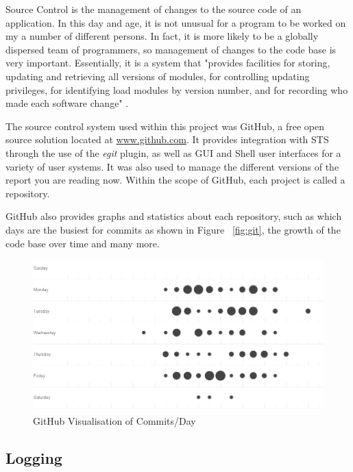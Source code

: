 Source Control is the management of changes to the source code of an application. In this day and age, it is not unusual for a program to be worked on my a number of different persons. In fact, it is more likely to be a globally dispersed team of programmers, so management of changes to the code base is very important. Essentially, it is a system that "provides facilities for storing, updating and retrieving all versions of modules, for controlling updating privileges, for identifying load modules by version number, and for recording who made each software change" \parencite{rochkind1975source}.

The source control system used within this project was GitHub, a free open source solution located at \href{http://www.github.com}{www.github.com}. It provides integration with STS through the use of the \textit{egit} plugin, as well as GUI and Shell user interfaces for a variety of user systems. It was also used to manage the different versions of the report you are reading now. Within the scope of GitHub, each project is called a repository.

GitHub also provides graphs and statistics about each repository, such as which days are the busiest for commits as shown in Figure ~\ref{fig:git}, the growth of the code base over time and many more.

\begin{figure}[H]
\begin{center}
\includegraphics[width=15cm]{git.png}
\end{center}
\caption{GitHub Visualisation of Commits/Day}
\label{fig:dispatcherflow}
\end{figure}

\subsection{Logging}

